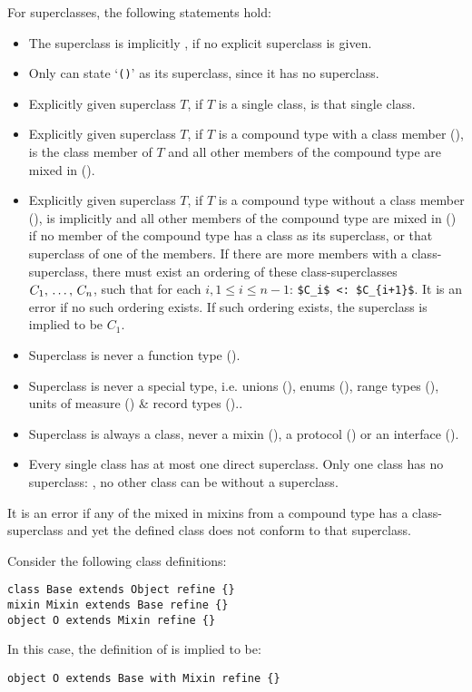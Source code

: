 For superclasses, the following statements hold:
\begin{itemize}
\item The superclass is implicitly , if no explicit superclass is given.
\item Only  can state `\lstinline!()!' as its superclass, since it has no superclass. 
\item Explicitly given superclass $T$, if $T$ is a single class, is that single class. 
\item Explicitly given superclass $T$, if $T$ is a compound type with a class member (), is the class member of $T$ and all other members of the compound type are mixed in (). 
\item Explicitly given superclass $T$, if $T$ is a compound type without a class member (), is implicitly  and all other members of the compound type are mixed in () if no member of the compound type has a class as its superclass, or that superclass of one of the members. If there are more members with a class-superclass, there must exist an ordering of these class-superclasses $C_1 ,\, \ldots ,\, C_n$, such that for each $i, 1 \le i \le n-1$: \lstinline!$C_i$ <: $C_{i+1}$!. It is an error if no such ordering exists. If such ordering exists, the superclass is implied to be $C_1$. 
\item Superclass is never a function type (). 
\item Superclass is never a special type, i.e. unions (), enums (), range types (), units of measure () \& record types ().. 
\item Superclass is always a class, never a mixin (), a protocol () or an interface (). 
\item Every single class has at most one direct superclass. Only one class has no superclass: , no other class can be without a superclass. 
\end{itemize}

It is an error if any of the mixed in mixins from a compound type has a class-superclass and yet the defined class does not conform to that superclass. 

\example Consider the following class definitions:
\begin{lstlisting}
class Base extends Object refine {}
mixin Mixin extends Base refine {}
object O extends Mixin refine {}
\end{lstlisting}
In this case, the definition of  is implied to be:
\begin{lstlisting}
object O extends Base with Mixin refine {}
\end{lstlisting}

